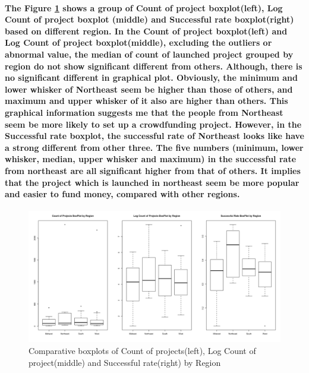 \documentclass[a4paper,10pt]{article}
\begin{document}
\paragraph{The Figure \ref{Boxplots_for_Count_and_SR} shows a group of Count of project boxplot(left), Log Count of project boxplot (middle) and Successful rate boxplot(right) based on different region. In the Count of project boxplot(left) and Log Count of project boxplot(middle), excluding the outliers or abnormal value, the median of count of launched project grouped by region do not show significant different from others. Although, there is no significant different in graphical plot. Obviously, the minimum and lower whisker of Northeast seem be higher than those of others, and maximum and upper whisker of it also are higher than others. This graphical information suggests me that the people from Northeast seem be more likely to set up a crowdfunding project. However, in the Successful rate boxplot, the successful rate of Northeast looks like have a strong different from other three. The five numbers (minimum, lower whisker, median, upper whisker and maximum) in the successful rate from northeast are all significant higher from that of others. It implies that the project which is launched in northeast seem be more popular and easier to fund money, compared with other regions.}

\begin{figure}
	\centering
	\includegraphics[width = \textwidth]{comparative_boxplots_for_Count_and_SR}
	\caption[Comparative boxplots of Count of projects(left), Log Count of project(middle) and Successful rate(right) by Region]{Comparative boxplots of Count of projects(left), Log Count of project(middle) and Successful rate(right) by Region}
	\label{Boxplots_for_Count_and_SR}
\end{figure}
\end{document}
